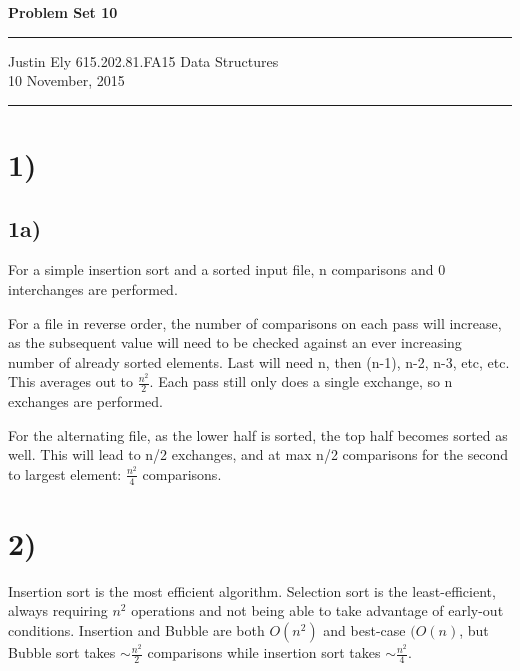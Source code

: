 \documentclass[a4paper,11pt]{article}
\begin{document}
\begin{flushright}

\vspace{1.1cm}

{\bf\Huge Problem Set 10}

\rule{0.25\linewidth}{0.5pt}

\vspace{0.5cm}
Justin Ely
\linebreak
\newline
\footnotesize{615.202.81.FA15 Data Structures \\}
\vspace{0.5cm}
10 November, 2015
\end{flushright}

\noindent\rule{\linewidth}{1.0pt}


\section*{1)}
\subsection*{1a)}
For a simple insertion sort and a sorted input file, n comparisons and 0 interchanges are performed.  

For a file in reverse order, the number of comparisons on each pass will increase, as the subsequent value will need
to be checked against an ever increasing number of already sorted elements.  Last will need n, then (n-1), n-2, n-3, etc, etc.
This averages out to $\frac{n^2}{2}$. Each pass still only does a single exchange, so n exchanges are performed. 

For the alternating file, as the lower half is sorted, the top half becomes sorted as well.  This will lead to n/2 exchanges, 
and at max n/2 comparisons for the second to largest element: $\frac{n^2}{4}$ comparisons.


\section*{2)}
Insertion sort is the most efficient algorithm.  Selection sort is the least-efficient, always requiring $n^2$ operations and
not being able to take advantage of early-out conditions.  Insertion and Bubble are both $O(n^2)$ and best-case $(O(n)$, 
but Bubble sort takes $\sim \frac{n^2}{2}$ comparisons while insertion sort takes $\sim \frac{n^2}{4}$.
\end{document}
